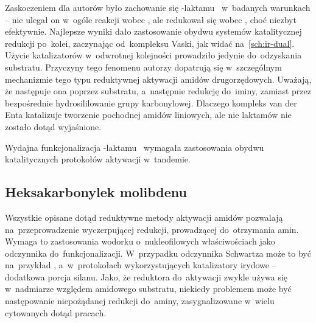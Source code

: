 Zaskoczeniem dla autorów było zachowanie się \textgamma{}-laktamu~
  w~badanych warunkach \--- nie ulegał on w~ogóle reakcji wobec ,
  ale redukował się wobec \vaska{}, choć niezbyt efektywnie.
Najlepsze wyniki dało zastosowanie obydwu systemów katalitycznej redukcji po~kolei,
  zaczynając od~kompleksu Vaski, jak widać na~\cref{sch:ir-dual}.
Użycie katalizatorów w~odwrotnej kolejności prowadziło jedynie do~odzyskania substratu.
Przyczyny tego fenomenu autorzy dopatrują się w~szczególnym mechanizmie tego typu
  reduktywnej aktywacji amidów drugorzędowych.
Uważają, że następuje ona poprzez  substratu, a~następnie redukcję do~iminy,
  zamiast przez bezpośrednie hydrosililowanie grupy karbonylowej.
Dlaczego kompleks van der Enta katalizuje tworzenie  pochodnej amidów liniowych,
  ale nie laktamów nie zostało dotąd wyjaśnione.
\begin{scheme*}
  
  \caption{
    Wydajna funkcjonalizacja \textgamma{}-laktamu~ wymagała zastosowania
      obydwu katalitycznych protokołów aktywacji w~tandemie.
  }
  \label{sch:ir-dual}
\end{scheme*}

\subsection{Heksakarbonylek molibdenu}\label{literature:new:molydenium}
Wszystkie opisane dotąd reduktywne metody aktywacji amidów pozwalają na~przeprowadzenie
  wyczerpującej redukcji, prowadzącej do~otrzymania amin.
Wymaga to zastosowania wodorku o~nukleofilowych właściwościach jako odczynnika do~funkcjonalizacji.
W~przypadku odczynnika Schwartza może to być na~przykład , a~w~protokołach
  wykorzystujących katalizatory irydowe \--- dodatkowa porcja silanu.
Jako, że reduktora do~aktywacji zwykle używa się w~nadmiarze względem amidowego substratu,
  niekiedy problemem może być następowanie niepożądanej redukcji do~aminy, zasygnalizowane
  w~wielu cytowanych dotąd pracach.

